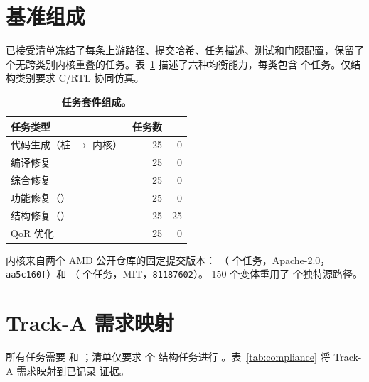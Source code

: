 \appendices

\section{基准组成}
\label{app:benchmark}

已接受清单冻结了每条上游路径、提交哈希、任务描述、测试和门限配置，保留了
\CorpusTaskCount{} 个无跨类别内核重叠的任务。表~\ref{tab:task-composition}
描述了六种均衡能力，每类包含 \TasksPerCategory{} 个任务。仅结构类别要求
C/RTL 协同仿真。

\begin{table}[H]
  \caption{\textbf{任务套件组成。}}
  \label{tab:task-composition}
  \centering
  \small
  \begin{tabular}{lrr}
    \toprule
    任务类型 & 任务数 & \CoSim{} \\
    \midrule
    代码生成（桩 $\to$ 内核） & 25 & 0 \\
    编译修复 & 25 & 0 \\
    综合修复 & 25 & 0 \\
    功能修复（\CSim{}） & 25 & 0 \\
    结构修复（\CoSim{}） & 25 & 25 \\
    QoR 优化 & 25 & 0 \\
    \bottomrule
  \end{tabular}
\end{table}

内核来自两个 AMD 公开仓库的固定提交版本：
（\IntroExampleTaskCount{} 个任务，Apache-2.0，\texttt{aa5c160f}）和
（\AccelExampleTaskCount{} 个任务，MIT，\texttt{81187602}）。
150 个变体重用了 \UniqueSourcePathCount{} 个独特源路径。

\section{Track-A 需求映射}
\label{app:compliance}

所有任务需要 \CSim{} 和 \Synth{}；清单仅要求 \RequiredCosimTaskCount{} 个
结构任务进行 \CoSim{}。表~\ref{tab:compliance} 将 Track-A 需求映射到已记录
证据。

